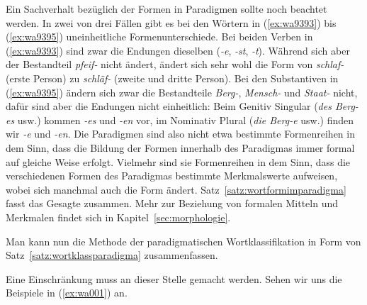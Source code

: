 Ein Sachverhalt bezüglich der Formen in Paradigmen sollte noch beachtet werden.
In zwei von drei Fällen gibt es bei den Wörtern in (\ref{ex:wa9393}) bis (\ref{ex:wa9395}) uneinheitliche Formenunterschiede.
Bei beiden Verben in (\ref{ex:wa9393}) sind zwar die Endungen dieselben (\textit{-e}, \textit{-st}, \textit{-t}).
Während sich aber der Bestandteil \textit{pfeif-} nicht ändert, ändert sich sehr wohl die Form von \textit{schlaf-} (erste Person) zu \textit{schläf-} (zweite und dritte Person).
Bei den Substantiven in (\ref{ex:wa9395}) ändern sich zwar die Bestandteile \textit{Berg-}, \textit{Mensch-} und \textit{Staat-} nicht, dafür sind aber die Endungen nicht einheitlich:
Beim Genitiv Singular (\textit{des Berg-es} usw.) kommen \textit{-es} und \textit{-en} vor, im Nominativ Plural (\textit{die Berg-e} usw.) finden wir \textit{-e} und \textit{-en}.
Die Paradigmen sind also nicht etwa bestimmte Formenreihen in dem Sinn, dass die Bildung der Formen innerhalb des Paradigmas immer formal auf gleiche Weise erfolgt.
Vielmehr sind sie Formenreihen in dem Sinn, dass die verschiedenen Formen des Paradigmas bestimmte Merkmalswerte aufweisen, wobei sich manchmal auch die Form ändert.
Satz~\ref{satz:wortformimparadigma} fasst das Gesagte zusammen.
Mehr zur Beziehung von formalen Mitteln und Merkmalen findet sich in Kapitel~\ref{sec:morphologie}.


Man kann nun die Methode der paradigmatischen Wortklassifikation in Form von Satz~\ref{satz:wortklassparadigma} zusammenfassen.



Eine Einschränkung muss an dieser Stelle gemacht werden.
Sehen wir uns die Beispiele in (\ref{ex:wa001}) an.

\begin{exe}
  \ex\label{ex:wa001}\begin{xlist}
  \end{xlist}
\end{exe}

